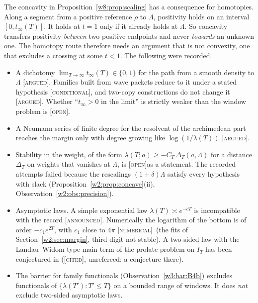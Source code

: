 \documentclass[11pt]{amsart}
\theoremstyle{definition}
\theoremstyle{remark}
\numberwithin{equation}{section}
\newcommand{\IT}{I_T}                                  %
\newcommand{\lam}{\lambda(T)}                          %
\newcommand{\stag}[1]{\textsc{[#1]}}
\newcommand{\CITED}{\stag{cited}}
\newcommand{\COND}{\stag{conditional}}
\newcommand{\ARGUED}{\stag{argued}}
\newcommand{\NUM}{\stag{numerical}}
\newcommand{\OPENQ}{\stag{open}}
\newcommand{\ANNOUNCED}{\stag{announced}}
\begin{document}
The concavity in Proposition~\ref{w8:prop:scaling} has a consequence for homotopies. Along a segment from a positive
reference $\rho$ to $\Lambda$, positivity holds on an interval $[0,t_\infty(T)]$. It holds at $t=1$ only if it already
holds at $\Lambda$. So concavity transfers positivity \emph{between} two positive endpoints and never \emph{towards} an
unknown one. The homotopy route therefore needs an argument that is not convexity, one that excludes a crossing at some
$t<1$. The following were recorded.
\begin{itemize}
\item A dichotomy $\lim_{T\to\infty}t_\infty(T)\in\{0,1\}$ for the path from a smooth density to $\Lambda$ \ARGUED.
  Families built from wave packets reduce to it under a stated hypothesis \COND, and two-copy constructions do not
  change it \ARGUED. Whether ``$t_\infty>0$ in the limit'' is strictly weaker than the window problem is \OPENQ.
\item A Neumann series of finite degree for the resolvent of the archimedean part reaches the margin only with degree
  growing like $\log(1/\lam)$ \ARGUED.
\item Stability in the weight, of the form $\lambda(T;a)\ge-C_T\,\Delta_T(a,\Lambda)$ for a distance $\Delta_T$ on
  weights that vanishes at $\Lambda$, is \OPENQ as a statement. The recorded attempts failed because the rescalings
  $(1+\delta)\Lambda$ satisfy every hypothesis with slack (Proposition~\ref{w2:prop:concave}(ii),
  Observation~\ref{w2:obs:precision}).
\item Asymptotic laws. A simple exponential law $\lam\asymp e^{-cT}$ is incompatible with the record
  \ANNOUNCED. Numerically the logarithm of the bottom is of order $-c_1e^{2T}$, with $c_1$ close to $4\pi$ \NUM\ (the
  fits of Section~\ref{w2:sec:margin}, third digit not stable). A two-sided law with the Landau--Widom-type main term of
  the prolate problem on $\IT$ has been conjectured in \cite{Zhu2026} (\CITED, unrefereed; a conjecture there).
\item The barrier for family functionals (Observation~\ref{w3:bar:B4b}) excludes functionals of $\{\lambda(T'):T'\le T\}$
  on a bounded range of windows. It does \emph{not} exclude two-sided asymptotic laws.
\end{itemize}
\end{document}
